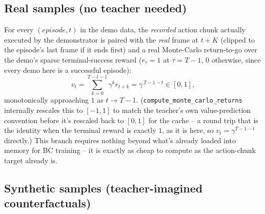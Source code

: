 \documentclass[11pt]{article}
\begin{document}
\subsection{Real samples (no teacher needed)}

For every $(episode, t)$ in the demo data, the \emph{recorded} action chunk actually executed by
the demonstrator is paired with the \emph{real} frame at $t+K$ (clipped to the episode's last frame
if it ends first) and a real Monte-Carlo return-to-go over the demo's sparse terminal-success
reward ($r_\tau = 1$ at $\tau=T-1$, $0$ otherwise, since every demo here is a successful episode):
\begin{equation}
    v_t = \sum_{k=0}^{T-t-1} \gamma^k r_{t+k} = \gamma^{\,T-1-t} \in [0, 1],
\end{equation}
monotonically approaching $1$ as $t \to T-1$. (\texttt{compute\_monte\_carlo\_returns} internally
rescales this to $[-1,1]$ to match the teacher's own value-prediction convention before it's
rescaled back to $[0,1]$ for the cache -- a round trip that is the identity when the terminal
reward is exactly $1$, as it is here, so $v_t = \gamma^{T-1-t}$ directly.) This branch requires
nothing beyond what's already loaded into memory for BC training -- it is exactly as cheap to
compute as the action-chunk target already is.

\subsection{Synthetic samples (teacher-imagined counterfactuals)}
\end{document}
